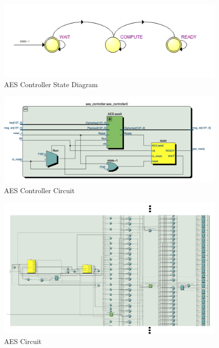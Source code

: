 \documentclass[journal, twocolumn, final,11pt,letterpaper]{IEEEtran}
\begin{document}
\begin{figure} [H]
	\centering
	\includegraphics[scale=.5]{AES_controller_state.png}
	\caption{AES Controller State Diagram\label{fig:aes-cont-state}}
\end{figure}    

\begin{figure} [H]
	\centering
	\includegraphics[scale=.5]{aes_controller_circuit.png}
	\caption{AES Controller Circuit\label{fig:aes_cont_circuit}}
\end{figure}    

\begin{figure} [H]
	\centering
	\includegraphics[scale=.35]{AES_circuit.png}
	\caption{AES Circuit\label{fig:AES_circuit}}
\end{figure}    
\end{document}

